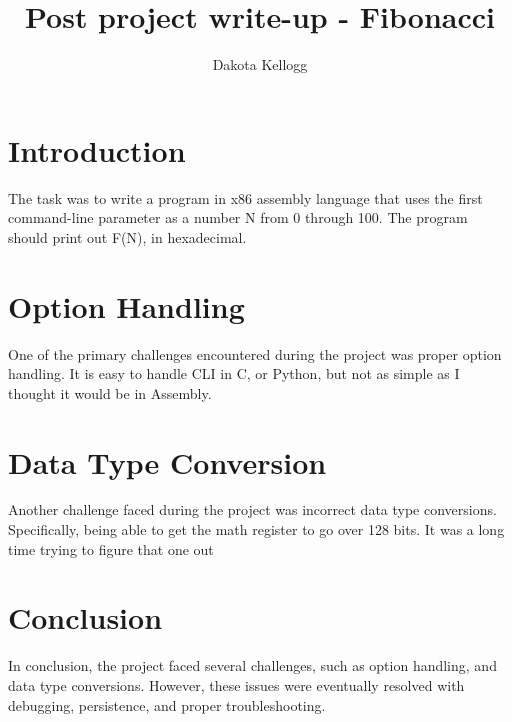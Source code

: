 \documentclass{article}
\begin{document}
\title{Post project write-up - Fibonacci}

\author{Dakota Kellogg}

\maketitle

\section{Introduction}
The task was to write a program in x86 assembly language that uses the first command-line parameter as a number N from 0 through 100. The program should print out F(N), in hexadecimal. 


\section{Option Handling}
One of the primary challenges encountered during the project was proper option handling. It is easy to handle CLI in C, or Python, but not as simple as I thought it would be in Assembly. 

\section{Data Type Conversion}
Another challenge faced during the project was incorrect data type conversions. Specifically, being able to get the math register to go over 128 bits. It was a long time trying to figure that one out

\section{Conclusion}
In conclusion, the project faced several challenges, such as option handling, and data type conversions. However, these issues were eventually resolved with debugging, persistence, and proper troubleshooting. 
\end{document}

